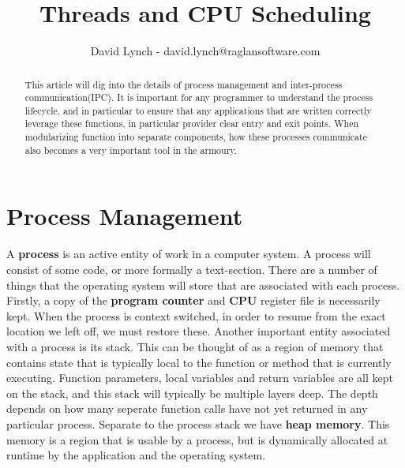 \documentclass[10pt,a4paper]{article}
\title{Threads and CPU Scheduling}
\author{David Lynch - david.lynch@raglansoftware.com }
\begin{document}
\maketitle
\begin{abstract}
This article will dig into the details of process management and inter-process communication(IPC). It is important for any programmer to understand the process lifecycle, and in particular to ensure that any applications that are written correctly leverage these functions, in particular provider clear entry and exit points. When modularizing function into separate components, how these processes communicate also becomes a very important tool in the armoury.
\end{abstract}
\section{Process Management}
A {\bf process} is an active entity of work in a computer system. A process will consist of some code, or more formally a text-section. There are a number of things that the operating system will store that are associated with each process. Firstly, a copy of the {\bf program counter} and {\bf CPU} register file is necessarily kept. When the process is context switched, in order to resume from the exact location we left off, we must restore these. Another important entity associated with a process is its stack. This can be thought of as a region of memory that contains state that is typically local to the function or method that is currently executing. Function parameters, local variables and return variables are all kept on the stack, and this stack will typically be multiple layers deep. The depth depends on how many seperate function calls have not yet returned in any particular process. Separate to the process stack we have {\bf heap memory}. This memory is a region that is usable by a process, but is dynamically allocated at runtime by the application and the operating system.
\end{document}
